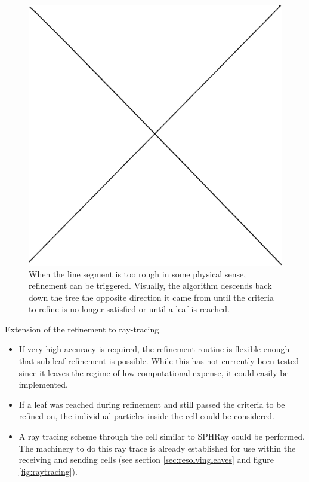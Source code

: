 \begin{figure}
\includegraphics[width=\textwidth]{graphics/placeholder.eps}
\caption[Refinement during the absorption algorithm.]{When the line segment is too rough in some physical sense, refinement can be triggered. Visually, the algorithm descends back down the tree the opposite direction it came from until the criteria to refine is no longer satisfied or until a leaf is reached.}
\label{fig:refining}
\end{figure}


Extension of the refinement to ray-tracing
\begin{itemize}
\item If very high accuracy is required, the refinement routine is flexible enough that sub-leaf refinement is possible. While this has not currently been tested since it leaves the regime of low computational expense, it could easily be implemented.
\item If a leaf was reached during refinement and still passed the criteria to be refined on, the individual particles inside the cell could be considered.
\item A ray tracing scheme through the cell similar to SPHRay \citep{altayCroftPelupessy08} could be performed. The machinery to do this ray trace is already established for use within the receiving and sending cells (see section \ref{sec:resolvingleaves} and figure \ref{fig:raytracing}).
\end{itemize}

